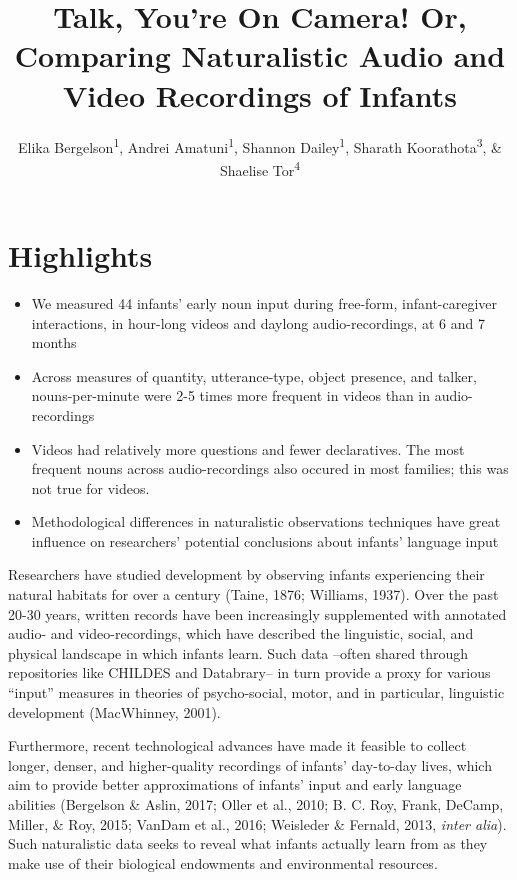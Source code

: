 \documentclass[floatsintext,man]{apa6}
\title{Talk, You're On Camera! Or, Comparing Naturalistic Audio and Video
Recordings of Infants}
\author{Elika Bergelson\textsuperscript{1}, Andrei Amatuni\textsuperscript{1}, Shannon Dailey\textsuperscript{1}, Sharath Koorathota\textsuperscript{3}, \& Shaelise Tor\textsuperscript{4}}
\affiliation{
    \vspace{0.5cm}
          \textsuperscript{1} Duke University\\
          \textsuperscript{2} University of Rochester\\
          \textsuperscript{3} Columbia University Medical Center\\
          \textsuperscript{4} Syracuse University  }
\providecommand{\tightlist}{%
  \setlength{\itemsep}{0pt}\setlength{\parskip}{0pt}}
\theoremstyle{definition}
\theoremstyle{definition}
\theoremstyle{definition}
\theoremstyle{remark}
\begin{document}
\maketitle

\setcounter{secnumdepth}{0}



\section{Highlights}\label{highlights}

\begin{itemize}
\tightlist
\item
  We measured 44 infants' early noun input during free-form,
  infant-caregiver interactions, in hour-long videos and daylong
  audio-recordings, at 6 and 7 months
\item
  Across measures of quantity, utterance-type, object presence, and
  talker, nouns-per-minute were 2-5 times more frequent in videos than
  in audio-recordings
\item
  Videos had relatively more questions and fewer declaratives. The most
  frequent nouns across audio-recordings also occured in most families;
  this was not true for videos.
\item
  Methodological differences in naturalistic observations techniques
  have great influence on researchers' potential conclusions about
  infants' language input
\end{itemize}

Researchers have studied development by observing infants experiencing
their natural habitats for over a century (Taine, 1876; Williams, 1937).
Over the past 20-30 years, written records have been increasingly
supplemented with annotated audio- and video-recordings, which have
described the linguistic, social, and physical landscape in which
infants learn. Such data --often shared through repositories like
CHILDES and Databrary-- in turn provide a proxy for various
\enquote{input} measures in theories of psycho-social, motor, and in
particular, linguistic development (MacWhinney, 2001).

Furthermore, recent technological advances have made it feasible to
collect longer, denser, and higher-quality recordings of infants'
day-to-day lives, which aim to provide better approximations of infants'
input and early language abilities (Bergelson \& Aslin, 2017; Oller et
al., 2010; B. C. Roy, Frank, DeCamp, Miller, \& Roy, 2015; VanDam et
al., 2016; Weisleder \& Fernald, 2013, \emph{inter alia}). Such
naturalistic data seeks to reveal what infants actually learn from as
they make use of their biological endowments and environmental
resources.
\end{document}

